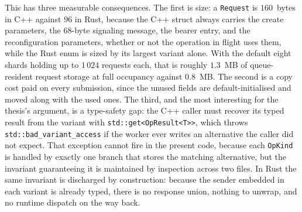 \documentclass[english,twoside,openright,a4paper,censored,csm,software-track-2020]{HYthesisML}
\begin{document}
This has three measurable consequences. The first is size: a \texttt{Request} is $160$~bytes
in C++ against $96$ in Rust, because the C++ struct always carries the create parameters, the
68-byte signaling message, the bearer entry, and the reconfiguration parameters, whether or
not the operation in flight uses them, while the Rust enum is sized by its largest variant
alone. With the default eight shards holding up to $1\,024$ requests each, that is roughly $1.3$~MB of
queue-resident request storage at full occupancy against $0.8$~MB. The second is a copy cost
paid on every submission, since the unused fields are default-initialised and moved along with
the used ones. The third, and the most interesting for the thesis's argument, is a type-safety
gap: the C++ caller must recover its typed result from the variant with
\texttt{std::get<OpResult<T>>}, which throws \texttt{std::bad\_variant\_access} if the worker
ever writes an alternative the caller did not expect. That exception cannot fire in the
present code, because each \texttt{OpKind} is handled by exactly one branch that stores the
matching alternative, but the invariant guaranteeing it is maintained by inspection across two
files. In Rust the same invariant is discharged by construction: because the sender embedded
in each variant is already typed, there is no response union, nothing to unwrap, and no
runtime dispatch on the way back.
\end{document}
